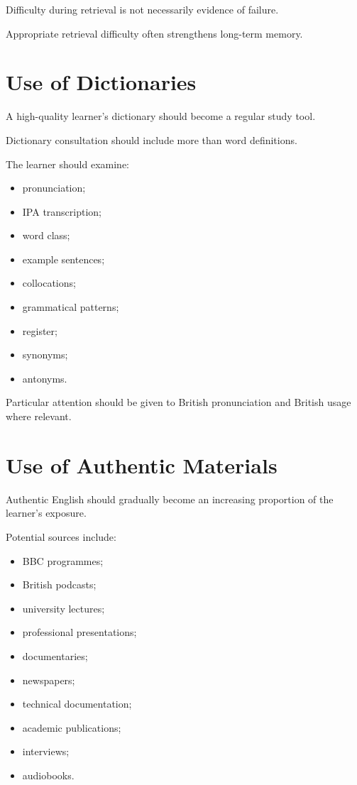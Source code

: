 Difficulty during retrieval is not necessarily evidence of failure.

Appropriate retrieval difficulty often strengthens long-term memory.

\section*{Use of Dictionaries}

A high-quality learner's dictionary should become a regular study tool.

Dictionary consultation should include more than word definitions.

The learner should examine:

\begin{itemize}
    \item pronunciation;
    \item IPA transcription;
    \item word class;
    \item example sentences;
    \item collocations;
    \item grammatical patterns;
    \item register;
    \item synonyms;
    \item antonyms.
\end{itemize}

Particular attention should be given to British pronunciation and British usage where relevant.

\section*{Use of Authentic Materials}

Authentic English should gradually become an increasing proportion of the learner's exposure.

Potential sources include:

\begin{itemize}
    \item BBC programmes;
    \item British podcasts;
    \item university lectures;
    \item professional presentations;
    \item documentaries;
    \item newspapers;
    \item technical documentation;
    \item academic publications;
    \item interviews;
    \item audiobooks.
\end{itemize}

